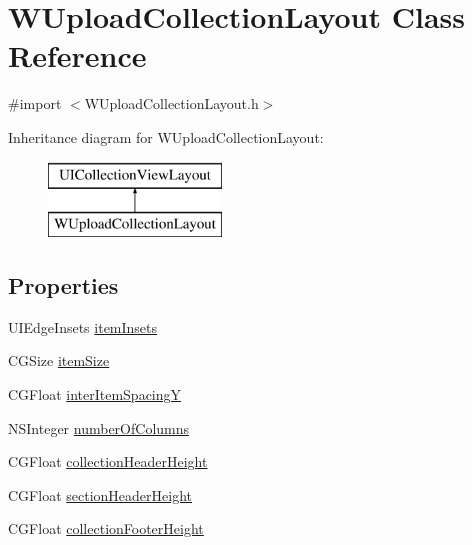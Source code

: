 \hypertarget{interface_w_upload_collection_layout}{\section{W\-Upload\-Collection\-Layout Class Reference}
\label{interface_w_upload_collection_layout}
}


{\ttfamily \#import $<$W\-Upload\-Collection\-Layout.\-h$>$}

Inheritance diagram for W\-Upload\-Collection\-Layout\-:\begin{figure}[H]
\begin{center}
\leavevmode
\includegraphics[height=2.000000cm]{interface_w_upload_collection_layout}
\end{center}
\end{figure}
\subsection*{Properties}
\begin{DoxyCompactItemize}
\item 
U\-I\-Edge\-Insets \hyperlink{interface_w_upload_collection_layout_ac9eeae48677264226fd2aea8aa73cfc8}{item\-Insets}
\item 
C\-G\-Size \hyperlink{interface_w_upload_collection_layout_ad93e43dcee6b8f26faf205b3d4f81b48}{item\-Size}
\item 
C\-G\-Float \hyperlink{interface_w_upload_collection_layout_a4e5f96f5f1ad8fd5bb4b13e3d69765b5}{inter\-Item\-Spacing\-Y}
\item 
N\-S\-Integer \hyperlink{interface_w_upload_collection_layout_a9cd6dda8b8f93bca6af2f5b617fedd3e}{number\-Of\-Columns}
\item 
C\-G\-Float \hyperlink{interface_w_upload_collection_layout_a4ee24fdc0750933bbf29a17cf0fd3577}{collection\-Header\-Height}
\item 
C\-G\-Float \hyperlink{interface_w_upload_collection_layout_acd25955f039a02a9c4504bb00c98f3d5}{section\-Header\-Height}
\item 
C\-G\-Float \hyperlink{interface_w_upload_collection_layout_a4491c65fa664696ecfeee6aabbee1a85}{collection\-Footer\-Height}
\end{DoxyCompactItemize}


